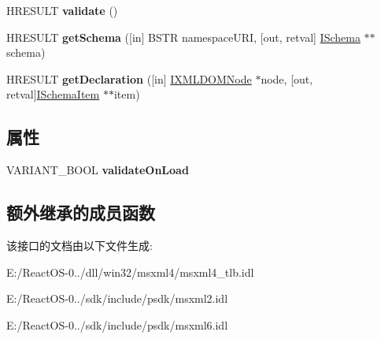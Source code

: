 \begin{DoxyCompactItemize}
\item 
\mbox{\label{interface_m_s_x_m_l2_1_1_i_x_m_l_d_o_m_schema_collection2_a935fdc096a37a40d4199416afb5ac926}} 
H\+R\+E\+S\+U\+LT {\bfseries validate} ()
\item 
\mbox{\label{interface_m_s_x_m_l2_1_1_i_x_m_l_d_o_m_schema_collection2_a3a6f724b1e8e4847ae3b6cf813c636ef}} 
H\+R\+E\+S\+U\+LT {\bfseries get\+Schema} (\mbox{[}in\mbox{]} B\+S\+TR namespace\+U\+RI, \mbox{[}out, retval\mbox{]} \hyperlink{interface_m_s_x_m_l2_1_1_i_schema}{I\+Schema} $\ast$$\ast$schema)
\item 
\mbox{\label{interface_m_s_x_m_l2_1_1_i_x_m_l_d_o_m_schema_collection2_ad472a4b73aac211c36226e8e6d31a694}} 
H\+R\+E\+S\+U\+LT {\bfseries get\+Declaration} (\mbox{[}in\mbox{]} \hyperlink{interface_m_s_x_m_l2_1_1_i_x_m_l_d_o_m_node}{I\+X\+M\+L\+D\+O\+M\+Node} $\ast$node, \mbox{[}out, retval\mbox{]}\hyperlink{interface_m_s_x_m_l2_1_1_i_schema_item}{I\+Schema\+Item} $\ast$$\ast$item)
\end{DoxyCompactItemize}
\subsection*{属性}
\begin{DoxyCompactItemize}
\item 
\mbox{\label{interface_m_s_x_m_l2_1_1_i_x_m_l_d_o_m_schema_collection2_a94d461db9e1b3f34b9b08c95f4163fd8}} 
V\+A\+R\+I\+A\+N\+T\+\_\+\+B\+O\+OL {\bfseries validate\+On\+Load}
\end{DoxyCompactItemize}
\subsection*{额外继承的成员函数}


该接口的文档由以下文件生成\+:\begin{DoxyCompactItemize}
\item 
E\+:/\+React\+O\+S-\/0../dll/win32/msxml4/msxml4\+\_\+tlb.\+idl\item 
E\+:/\+React\+O\+S-\/0../sdk/include/psdk/msxml2.\+idl\item 
E\+:/\+React\+O\+S-\/0../sdk/include/psdk/msxml6.\+idl\end{DoxyCompactItemize}

